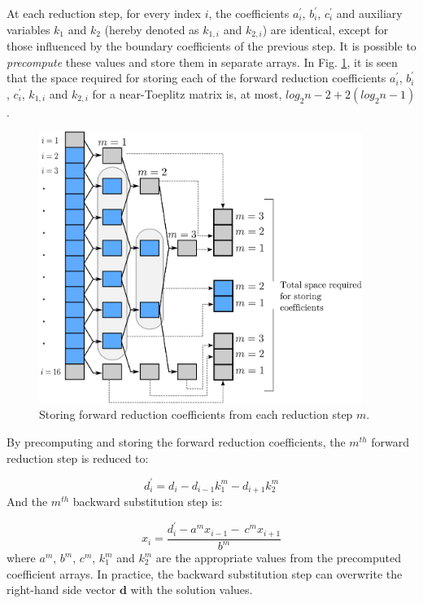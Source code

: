 \documentclass{elsarticle}
\begin{document}
At each reduction step,
for every index $i$,
the coefficients $a_i^\prime$, $b_i^\prime$, $c_i^\prime$
and auxiliary variables $k_1$ and $k_2$
(hereby denoted as $k_{1,i}$ and $k_{2,i}$) are identical,
except for those influenced by the
boundary coefficients of the previous step.
It is possible to \emph{precompute} these values
and store them in separate arrays.
In Fig. \ref{fig:cyclic-reduction-precomputing},
it is seen that the space required for storing each of the
forward reduction coefficients
$a_i^\prime$, $b_i^\prime$, $c_i^\prime$,
$k_{1,i}$ and $k_{2,i}$
for a near-Toeplitz matrix
is, at most, $log_2n-2 + 2(log_2n-1)$.

\begin{figure}
\begin{center}
\includegraphics[height=250pt]{img/cyclic-reduction-precomputing.eps}
\end{center}
\caption{Storing forward reduction coefficients
    from each reduction step $m$.}
\label{fig:cyclic-reduction-precomputing}
\end{figure}

By precomputing and storing the forward reduction
coefficients,
the $m^{th}$ forward reduction step is reduced to:

\begin{equation}
d^{\prime}_i = d_i - d_{i-1}k_1^{m}  - d_{i+1}k_2^{m}
\label{eqn:precomputed-forward-reduction-step}
\end{equation}
%
And the $m^{th}$ backward substitution step is:

\begin{equation}
x_i = \frac{d^{\prime}_i - a^mx_{i-1} - \
    c^{m}x_{i+1}}{b^m}
\label{eqn:precomputed-backward-substitution-step}
\end{equation}
%
where $a^m$, $b^m$, $c^m$, $k_1^m$ and $k_2^m$
are the appropriate values
from the precomputed coefficient arrays.
In practice,
the backward substitution step
can overwrite the right-hand side vector $\bm{d}$
with the solution values.
\end{document}
